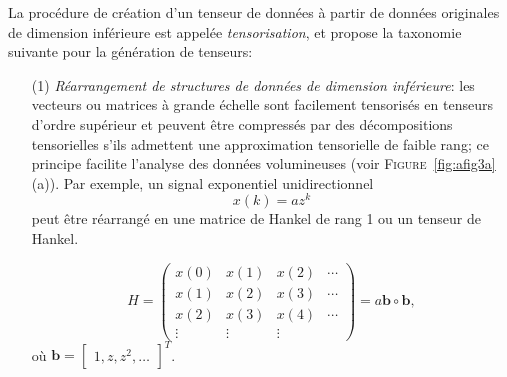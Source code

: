 \documentclass[11pt,a4paper,oneside]{book}
\def\b{\mathbf b}
\newcommand{\figref}[1]{\textsc{Figure}~\ref{#1}}
\begin{document}
La procédure de création d'un tenseur de données à partir de données originales de dimension inférieure est appelée \textit{tensorisation}, et \cite[p.148]{cichocki2015tensor} propose la taxonomie suivante pour la génération de tenseurs:

\begin{enumerate}
\item[(1)]\textit{Réarrangement de structures de données de dimension inférieure}: les vecteurs ou matrices à grande échelle sont facilement tensorisés en tenseurs d'ordre supérieur et peuvent être compressés par des décompositions tensorielles s'ils admettent une approximation tensorielle de faible rang; ce principe facilite l'analyse des données volumineuses (voir \figref{fig:afig3a}(a)). Par exemple, un signal exponentiel unidirectionnel
\begin{equation}
x(k) = az^{k}
\end{equation} peut être réarrangé en une matrice de Hankel de rang 1 ou un tenseur de Hankel.

\begin{equation}\label{hankel}
H=\begin{pmatrix}
x(0)&x(1)&x(2)&\cdots\\
x(1)&x(2)&x(3)&\cdots\\
x(2)&x(3)&x(4)&\cdots\\
\vdots&\vdots&\vdots&
\end{pmatrix}=a\b\circ\b,
\end{equation}
où $ \b=\begin{bmatrix}
1,z,z^{2},\dots
\end{bmatrix}^{T} $. 


\end{enumerate}
\end{document}
